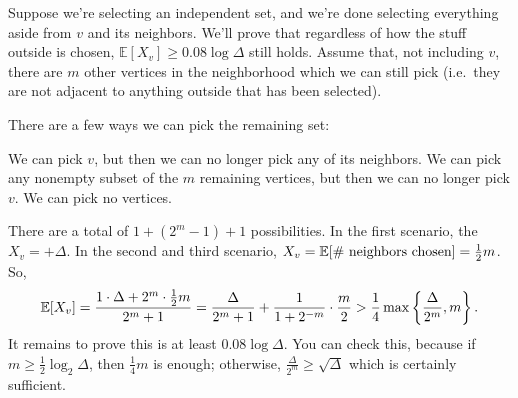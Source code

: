 \documentclass[11pt]{scrartcl}
\newcommand\EE{\mathbb E}
\begin{document}
Suppose we're selecting an independent set, and we're done selecting everything aside from $v$ and its neighbors.
We'll prove that regardless of how the stuff outside is chosen, $\EE[X_v] \ge 0.08 \log \Delta$ still holds.
Assume that, not including $v$, there are $m$ other vertices in the neighborhood which we can still pick (i.e.\ they
are not adjacent to anything outside that has been selected).

There are a few ways we can pick the remaining set:
\begin{itemize}
	\ii We can pick $v$, but then we can no longer pick any of its neighbors.
	\ii We can pick any nonempty subset of the $m$ remaining vertices, but then we can no longer pick $v$.
	\ii We can pick no vertices.
\end{itemize}
There are a total of $1 + \left( 2^m-1 \right) + 1$ possibilities.
In the first scenario, the $X_v = +\Delta$.
In the second and third scenario, $X_v = \EE[\text{\# neighbors chosen}] = \half m$.
So,
\[ \EE[X_v] = \frac{1 \cdot \Delta + 2^m \cdot \half m}{2^m+1}
	= \frac{\Delta}{2^m+1} + \frac{1}{1+2^{-m}} \cdot \frac{m}{2}
	> \frac14 \max \left\{ \frac{\Delta}{2^m}, m \right\}. \]
It remains to prove this is at least $0.08 \log \Delta$.
You can check this, because if $m \ge \frac 12 \log_2 \Delta$, then $\frac 14m$ is enough;
otherwise, $\frac{\Delta}{2^m} \ge \sqrt\Delta$ which is certainly sufficient.
\end{document}
